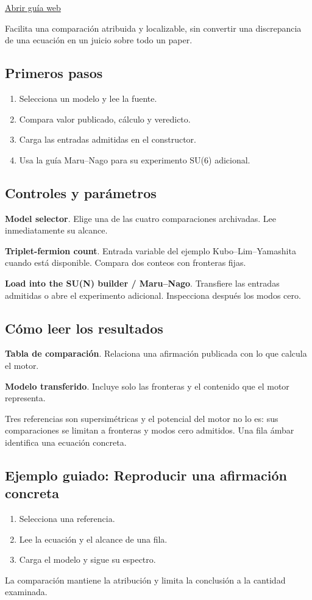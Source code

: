 \documentclass[11pt,a4paper]{article}
\begin{document}
\href{https://karlesmarin.github.io/ghu-explorer/guide/es/papers/index.html}{Abrir guía web}

Facilita una comparación atribuida y localizable, sin convertir una discrepancia de una ecuación en un juicio sobre todo un paper.
\subsection*{Primeros pasos}
\begin{enumerate}
\item Selecciona un modelo y lee la fuente.
\item Compara valor publicado, cálculo y veredicto.
\item Carga las entradas admitidas en el constructor.
\item Usa la guía Maru--Nago para su experimento SU(6) adicional.
\end{enumerate}
\subsection*{Controles y parámetros}
\textbf{Model selector}. Elige una de las cuatro comparaciones archivadas. Lee inmediatamente su alcance.

\textbf{Triplet-fermion count}. Entrada variable del ejemplo Kubo--Lim--Yamashita cuando está disponible. Compara dos conteos con fronteras fijas.

\textbf{Load into the SU(N) builder / Maru--Nago}. Transfiere las entradas admitidas o abre el experimento adicional. Inspecciona después los modos cero.

\subsection*{Cómo leer los resultados}
\textbf{Tabla de comparación}. Relaciona una afirmación publicada con lo que calcula el motor.

\textbf{Modelo transferido}. Incluye solo las fronteras y el contenido que el motor representa.

Tres referencias son supersimétricas y el potencial del motor no lo es: sus comparaciones se limitan a fronteras y modos cero admitidos. Una fila ámbar identifica una ecuación concreta.
\subsection*{Ejemplo guiado: Reproducir una afirmación concreta}
\begin{enumerate}
\item Selecciona una referencia.
\item Lee la ecuación y el alcance de una fila.
\item Carga el modelo y sigue su espectro.
\end{enumerate}
La comparación mantiene la atribución y limita la conclusión a la cantidad examinada.
\end{document}

